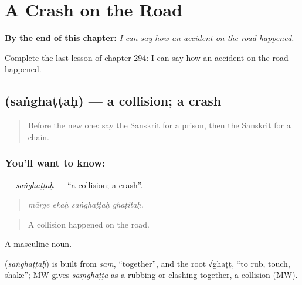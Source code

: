 
\chapter{A Crash on the Road}
\label{ch:sa-a-crash-on-the-road}

\begin{chapteropening}
\textbf{By the end of this chapter:} \emph{I can say how an accident on the road happened.}

Complete the last lesson of chapter 294: I can say how an accident on the road happened.
\end{chapteropening}

\section[\texorpdfstring{\sk{संघट्टः} (saṅghaṭṭaḥ)}{संघट्टः (saṅghaṭṭaḥ)}]{ (saṅghaṭṭaḥ) — a collision; a crash}

\label{lesson:SA-C294-sanghattah}



\begin{quote}
Before the new one: say the Sanskrit for a prison, then the Sanskrit for a chain.
\end{quote}

\subsection*{You'll want to know: }
\textbf{} — \emph{saṅghaṭṭaḥ} — \textquotedblleft{}a collision; a crash\textquotedblright{}.

\begin{quote}
   
\end{quote}

\begin{quote}
\emph{mārge ekaḥ saṅghaṭṭaḥ ghaṭitaḥ.}
\end{quote}

\begin{quote}
A collision happened on the road.
\end{quote}

A masculine noun.

\begin{cousinweb}
\textbf{} (\emph{saṅghaṭṭaḥ}) is built from \emph{sam}, \textquotedblleft{}together\textquotedblright{}, and the root √ghaṭṭ, \textquotedblleft{}to rub, touch, shake\textquotedblright{}; MW gives \emph{saṃghaṭṭa} as a rubbing or clashing together, a collision (MW).
\end{cousinweb}

